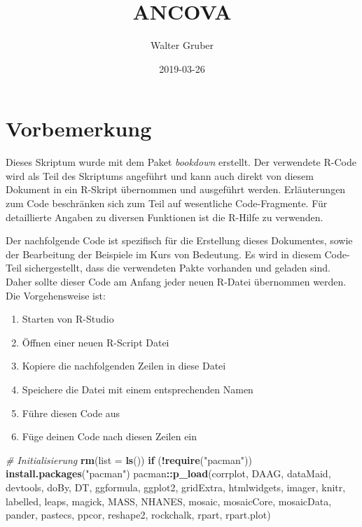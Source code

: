 \documentclass[]{article}
\title{ANCOVA}
\author{Walter Gruber}
\date{2019-03-26}
\newenvironment{Shaded}{\begin{snugshade}}{\end{snugshade}}
\newcommand{\KeywordTok}[1]{\textcolor[rgb]{0.13,0.29,0.53}{\textbf{#1}}}
\newcommand{\DataTypeTok}[1]{\textcolor[rgb]{0.13,0.29,0.53}{#1}}
\newcommand{\StringTok}[1]{\textcolor[rgb]{0.31,0.60,0.02}{#1}}
\newcommand{\CommentTok}[1]{\textcolor[rgb]{0.56,0.35,0.01}{\textit{#1}}}
\newcommand{\ControlFlowTok}[1]{\textcolor[rgb]{0.13,0.29,0.53}{\textbf{#1}}}
\newcommand{\OperatorTok}[1]{\textcolor[rgb]{0.81,0.36,0.00}{\textbf{#1}}}
\newcommand{\NormalTok}[1]{#1}
\providecommand{\tightlist}{%
  \setlength{\itemsep}{0pt}\setlength{\parskip}{0pt}}
\begin{document}
\maketitle

{
\setcounter{tocdepth}{2}
\tableofcontents
}
\section*{Vorbemerkung}\label{vorbemerkung}

Dieses Skriptum wurde mit dem Paket \emph{bookdown} erstellt. Der
verwendete R-Code wird als Teil des Skriptums angeführt und kann auch
direkt von diesem Dokument in ein R-Skript übernommen und ausgeführt
werden. Erläuterungen zum Code beschränken sich zum Teil auf wesentliche
Code-Fragmente. Für detaillierte Angaben zu diversen Funktionen ist die
R-Hilfe zu verwenden.

Der nachfolgende Code ist spezifisch für die Erstellung dieses
Dokumentes, sowie der Bearbeitung der Beispiele im Kurs von Bedeutung.
Es wird in diesem Code-Teil sichergestellt, dass die verwendeten Pakte
vorhanden und geladen sind. Daher sollte dieser Code am Anfang jeder
neuen R-Datei übernommen werden. Die Vorgehensweise ist:

\begin{enumerate}
\def\labelenumi{\arabic{enumi}.}
\tightlist
\item
  Starten von R-Studio
\item
  Öffnen einer neuen R-Script Datei
\item
  Kopiere die nachfolgenden Zeilen in diese Datei
\item
  Speichere die Datei mit einem entsprechenden Namen
\item
  Führe diesen Code aus
\item
  Füge deinen Code nach diesen Zeilen ein
\end{enumerate}

\begin{Shaded}
\begin{Highlighting}[]
\CommentTok{# Initialisierung}
\KeywordTok{rm}\NormalTok{(}\DataTypeTok{list =} \KeywordTok{ls}\NormalTok{())}
\ControlFlowTok{if}\NormalTok{ (}\OperatorTok{!}\KeywordTok{require}\NormalTok{(}\StringTok{"pacman"}\NormalTok{)) }\KeywordTok{install.packages}\NormalTok{(}\StringTok{"pacman"}\NormalTok{)}
\NormalTok{pacman}\OperatorTok{::}\KeywordTok{p_load}\NormalTok{(corrplot, DAAG, dataMaid, devtools, doBy, DT, }
\NormalTok{               ggformula, ggplot2, gridExtra, htmlwidgets, }
\NormalTok{               imager, knitr, labelled, leaps, magick, MASS, }
\NormalTok{               NHANES, mosaic, mosaicCore, mosaicData, pander,}
\NormalTok{               pastecs, ppcor, reshape2, }
\NormalTok{               rockchalk, rpart, rpart.plot)}
\end{Highlighting}
\end{Shaded}
\end{document}
